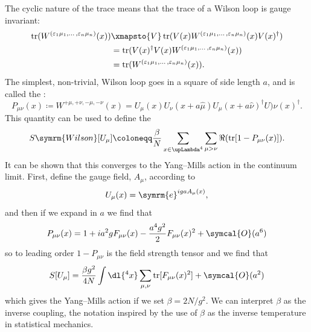 \documentclass[fleqn]{NotesClass}
\newcommand{\e}{\symrm{e}}
\newcommand{\hermit}{\dagger}
\newcommand{\order}{\symcal{O}}
\DeclareMathOperator{\tr}{tr}
\newcommand{\lattice}[1][4]{\upLambda^{#1}}
\begin{document}
    The cyclic nature of the trace means that the trace of a Wilson loop is gauge invariant:
    \begin{align}
        \tr(W^{(\varepsilon_1\mu_1, \dotso, \varepsilon_n\mu_n)}(x)) &\xmapsto{V} \tr(V(x)W^{(\varepsilon_1\mu_1, \dotso, \varepsilon_n\mu_n)}(x)V(x)^\hermit)\\
        &= \tr(V(x)^\hermit V(x)W^{(\varepsilon_1\mu_1, \dotso, \varepsilon_n\mu_n)}(x))\\
        &= \tr(W^{(\varepsilon_1\mu_1, \dotso, \varepsilon_n\mu_n)}(x)).
    \end{align}
    The simplest, non-trivial, Wilson loop goes in a square of side length \(a\), and is called the :
    \begin{equation}
        P_{\mu\nu}(x) \coloneqq W^{+\mu, +\nu, -\mu, -\nu}(x) = U_\mu(x)U_\nu(x + a\hat{\mu})U_\mu(x + a\hat{\nu})^\hermit U)\nu(x)^\hermit.
    \end{equation}
    This quantity can be used to define the 
    \begin{equation}
        S{\symrm{Wilson}}[U_\mu] \coloneqq \frac{\beta}{N} \sum_{x\in\lattice} \sum_{\mu > \nu} \Re(\tr[1 - P_{\mu\nu}(x)]).
    \end{equation}
    It can be shown that this converges to the Yang--Mills action in the continuum limit.
    First, define the gauge field, \(A_\mu\), according to
    \begin{equation}
        U_\mu(x) = \e^{iga A_\mu(x)},
    \end{equation}
    and then if we expand in \(a\) we find that
    \begin{equation}
        P_{\mu\nu}(x) = 1 + ia^2gF_{\mu\nu}(x) - \frac{a^4g^2}{2}F_{\mu\nu}(x)^2 + \order(a^6)
    \end{equation}
    so to leading order \(1 - P_{\mu\nu}\) is the field strength tensor and we find that
    \begin{equation}
        S[U_\mu] = \frac{\beta g^2}{4N} \int \dl{^4x} \sum_{\mu, \nu} \tr[F_{\mu\nu}(x)^2] + \order(a^2)
    \end{equation}
    which gives the Yang--Mills action if we set \(\beta = 2N/g^2\).
    We can interpret \(\beta\) as the inverse coupling, the notation inspired by the use of \(\beta\) as the inverse temperature in statistical mechanics.
    
\end{document}
